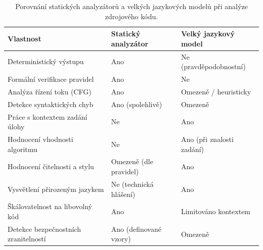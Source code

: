 \begin{table}[H]
    \centering
    \begin{tabular}{lll}
        \toprule
        \textbf{Vlastnost}                   & \textbf{Statický analyzátor} & \textbf{Velký jazykový model} \\
        \midrule
        Deterministický výstupu              & Ano                          & Ne (pravděpodobnostní)        \\
        Formální verifikace pravidel         & Ano                          & Ne                            \\
        Analýza řízení toku (CFG)            & Ano                          & Omezeně / heuristicky         \\
        Detekce syntaktických chyb           & Ano (spolehlivě)             & Omezeně                       \\
        Práce s kontextem zadání úlohy       & Ne                           & Ano                           \\
        Hodnocení vhodnosti algoritmu        & Ne                           & Ano (při znalosti zadání)     \\
        Hodnocení čitelnosti a stylu         & Omezeně (dle pravidel)       & Ano                           \\
        Vysvětlení přirozeným jazykem        & Ne (technická hlášení)       & Ano                           \\
        Škálovatelnost na libovolný kód      & Ano                          & Limitováno kontextem          \\
        Detekce bezpečnostních zranitelností & Ano (definované vzory)       & Omezeně                       \\
        \bottomrule
    \end{tabular}
    \caption{Porovnání statických analyzátorů a velkých jazykových modelů při analýze zdrojového kódu.}
    \label{tab:llm-vs-static-summary}
\end{table}

\endinput